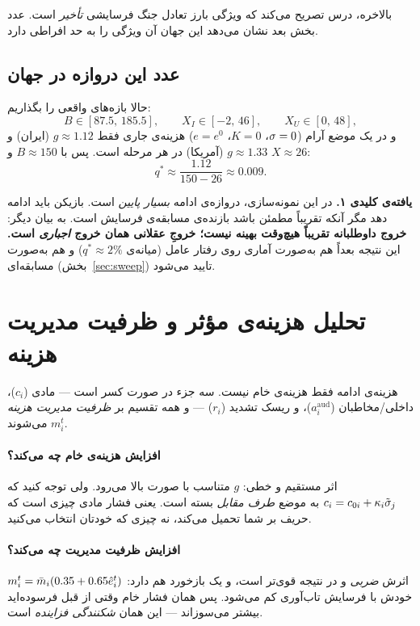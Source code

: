 \documentclass[12pt,a4paper]{article}
\begin{document}
بالاخره، درس تصریح می‌کند که ویژگی بارز تعادل جنگ فرسایشی \emph{تأخیر}
است. عدد بخش بعد نشان می‌دهد این جهان آن ویژگی را به حد افراطی دارد.

\subsection{عدد این دروازه در جهان }

حالا بازه‌های واقعی را بگذاریم:
\[
  B\in[87.5,\,185.5],\qquad X_I\in[-2,\,46],\qquad X_U\in[0,\,48],
\]
و در یک موضع آرام ($\sigma=0$، $K=0$، $e=e^0$) هزینه‌ی جاری فقط
$g\approx1.12$ (ایران) و $g\approx1.33$ (آمریکا) در هر مرحله است. پس با
$B\approx150$ و $X\approx26$:
\[
  q^\ast\approx\frac{1.12}{150-26}\approx0.009 .
\]

\begin{findbox}
\textbf{یافته‌ی کلیدی ۱.} در این نمونه‌سازی، دروازه‌ی ادامه \emph{بسیار پایین}
است. بازیکن باید ادامه دهد مگر آنکه تقریباً مطمئن باشد بازنده‌ی مسابقه‌ی
فرسایش است. به بیان دیگر: \textbf{خروج داوطلبانه تقریباً هیچ‌وقت بهینه نیست؛
خروجِ عقلانی همان خروج \emph{اجباری} است.} این نتیجه بعداً هم به‌صورت آماری
روی رفتار عامل (میانه‌ی $q^\ast\approx2\%$) و هم به‌صورت مسابقه‌ای
(بخش~\ref{sec:sweep}) تایید می‌شود.
\end{findbox}

\section{تحلیل هزینه‌ی مؤثر و ظرفیت مدیریت هزینه}\label{sec:cost}

هزینه‌ی ادامه فقط هزینه‌ی خام نیست. سه جزء در صورت کسر است — مادی
($c_i$)، داخلی/مخاطبان ($a^{\mathrm{aud}}_i$)، و ریسک تشدید ($r_i$) — و همه
تقسیم بر \emph{ظرفیت مدیریت هزینه} $m_i^t$ می‌شوند.

\paragraph{افزایش هزینه‌ی خام چه می‌کند؟}
اثر مستقیم و خطی: $g$ متناسب با صورت بالا می‌رود. ولی توجه کنید که
$c_i=c_{0i}+\kappa_i\tilde{\sigma}_j$ به موضع \emph{طرف مقابل} بسته است. یعنی
فشار مادی چیزی است که حریف بر شما تحمیل می‌کند، نه چیزی که خودتان انتخاب
می‌کنید.

\paragraph{افزایش ظرفیت مدیریت چه می‌کند؟}
اثرش \emph{ضربی} و در نتیجه قوی‌تر است، و یک بازخورد هم دارد:
$m_i^t=\bar{m}_i(0.35+0.65\hat{e}_i^t)$ خودش با فرسایش تاب‌آوری کم می‌شود. پس
همان فشار خام وقتی از قبل فرسوده‌اید بیشتر می‌سوزاند — این همان
\emph{شکنندگی فزاینده} است.
\end{document}
